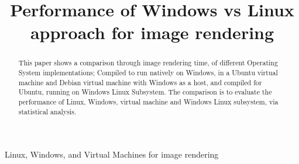 \documentclass[conference]{IEEEtran}
\begin{document}
\title{Performance of Windows vs Linux approach for image rendering}

\author{

}

\maketitle

\begin{abstract}
This paper shows a comparison through image rendering time, of different Operating System implementations; Compiled to run natively on Windows, in a Ubuntu virtual machine and Debian virtual machine with Windows as a host, and compiled for Ubuntu, running on Windows Linux Subsystem. The comparison is to evaluate the performance of Linux, Windows, virtual machine and Windows Linux subsystem, via statistical analysis. 

\end{abstract}

\begin{IEEEkeywords}
Linux, Windows, and Virtual Machines for image rendering
\end{IEEEkeywords}
\end{document}
